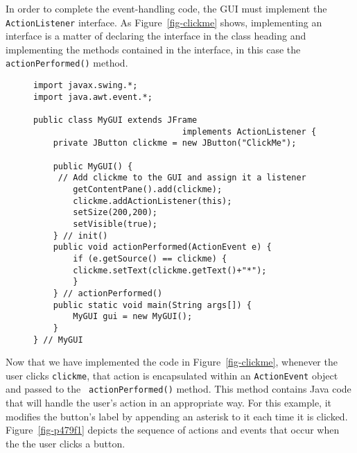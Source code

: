 \pagebreak
In order to complete the event-handling code, the GUI must implement
the {\tt ActionListener} interface.  As Figure~\ref{fig-clickme}
shows, implementing an interface is a matter of declaring the
interface in the class heading and implementing the methods contained
in the interface, in this case the {\tt actionPerformed()} method.

\begin{figure}[h]
\jjjprogstart
\begin{jjjlisting}
\begin{lstlisting}
import javax.swing.*;
import java.awt.event.*;

public class MyGUI extends JFrame 
                              implements ActionListener {
    private JButton clickme = new JButton("ClickMe");

    public MyGUI() {
     // Add clickme to the GUI and assign it a listener
        getContentPane().add(clickme);   
        clickme.addActionListener(this);
        setSize(200,200);
        setVisible(true);
    } // init()
    public void actionPerformed(ActionEvent e) {
        if (e.getSource() == clickme) {
	    clickme.setText(clickme.getText()+"*");
        }
    } // actionPerformed()
    public static void main(String args[]) {
        MyGUI gui = new MyGUI();
    }
} // MyGUI
\end{lstlisting}
\end{jjjlisting}
\end{figure}

\begin{figure}[tb]
\end{figure}

Now that we have implemented the code in Figure~\ref{fig-clickme},
whenever the user clicks {\tt clickme}, that action is encapsulated
within an {\tt ActionEvent} object and passed to the {\tt
actionPerformed()} method.  This method contains Java code that will
handle the user's action in an appropriate way.  For this example, it
modifies the button's label by appending an asterisk to it each time
it is clicked.  Figure~\ref{fig-p479f1} depicts the
sequence of actions and events that occur when the the user 
clicks a button.

